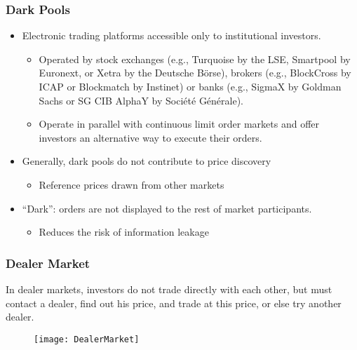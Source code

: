 \documentclass[10pt]{beamer}
\begin{document}
	\begin{frame}
		\frametitle{Dark Pools}
		\begin{itemize}
			\item Electronic trading platforms accessible only to institutional investors.
			\begin{itemize}
				\item Operated by stock exchanges (e.g., Turquoise by the LSE, Smartpool by Euronext, or Xetra by the Deutsche Börse), brokers (e.g., BlockCross by ICAP or Blockmatch by Instinet) or banks (e.g., SigmaX by Goldman Sachs or SG CIB AlphaY by Société Générale). 
				\item Operate in parallel with continuous limit order markets and  offer investors an alternative way to execute their orders.
			\end{itemize}
			
			\item Generally, dark pools do not contribute to price discovery
			\begin{itemize}
				\item Reference prices drawn from other markets
			\end{itemize}
			\item ``Dark'': orders are not displayed to the rest of market participants.
			\begin{itemize}
				\item Reduces the risk of information leakage
			\end{itemize}
			
		\end{itemize}	
		
		
	\end{frame}
	
	
	
	\begin{frame}
		\frametitle{Dealer Market}
		{\scriptsize In dealer markets, investors do not trade directly with each other, but must	contact a dealer, find out his price, and trade at this price, or else try another dealer.}
		\begin{figure}
			\texttt{[image: DealerMarket]}
		\end{figure}	
		
	\end{frame}
	
	
	
\end{document}
